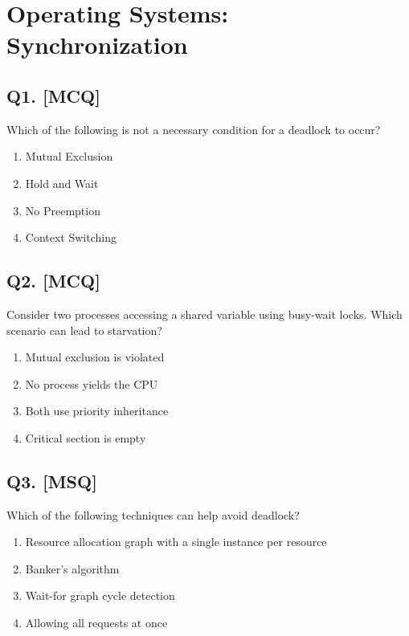 \section{Operating Systems: Synchronization}

\subsection*{Q1. [MCQ]}
Which of the following is not a necessary condition for a deadlock to occur?

\begin{enumerate}[label=(\alph*)]
    \item Mutual Exclusion
    \item Hold and Wait
    \item No Preemption
    \item Context Switching
\end{enumerate}

\subsection*{Q2. [MCQ]}
Consider two processes accessing a shared variable using busy-wait locks. Which scenario can lead to starvation?

\begin{enumerate}[label=(\alph*)]
    \item Mutual exclusion is violated
    \item No process yields the CPU
    \item Both use priority inheritance
    \item Critical section is empty
\end{enumerate}

\subsection*{Q3. [MSQ]}
Which of the following techniques can help avoid deadlock?

\begin{enumerate}[label=(\alph*)]
    \item Resource allocation graph with a single instance per resource
    \item Banker's algorithm
    \item Wait-for graph cycle detection
    \item Allowing all requests at once
\end{enumerate}


